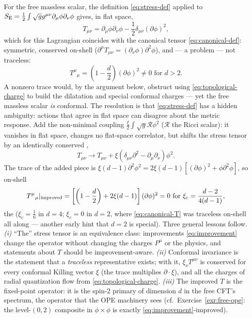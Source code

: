 \begin{eexample}
\label{ex:scalar-stress}
For the free massless scalar, the definition \eqref{eq:stress-def} applied to
$S_{\rm E} = \frac12\int \sqrt g g^{\mu\nu}\partial_\mu\phi\partial_\nu\phi$
gives, in flat space,
\begin{equation}
T_{\mu\nu} = \partial_\mu \phi \partial_\nu \phi
- \frac{1}{2}\delta_{\mu\nu} (\partial\phi)^2 ,
\label{eq:canonical-T}
\end{equation}
which for this Lagrangian coincides with the canonical tensor
\eqref{eq:canonical-def}: symmetric,
conserved on-shell ($\partial^\mu T_{\mu\nu} = (\partial_\nu \phi)
\partial^2\phi$), and --- a problem --- not traceless:
\begin{equation}
T^{\mu}{}_{\mu} = \left(1 - \frac d2\right)(\partial\phi)^2 \ne 0
\text{ for } d > 2.
\end{equation}
A nonzero trace would, by the argument below, obstruct using
\eqref{eq:topological-charge} to build the dilatation and special conformal
charges --- yet the free massless scalar \emph{is} conformal. The resolution
is that \eqref{eq:stress-def} has a hidden ambiguity: actions that agree in
flat space can disagree about the metric response. Add the non-minimal
coupling $\frac{\xi}{2} \int \sqrt g \mathcal{R} \phi^2$ ($\mathcal{R}$
the Ricci scalar): it vanishes in flat space, changes no flat-space
correlator, but shifts the stress tensor by an identically conserved
,
\begin{equation}
T_{\mu\nu} \longrightarrow T_{\mu\nu}
+ \xi \left(\delta_{\mu\nu}\partial^2 - \partial_\mu \partial_\nu\right)\phi^2 .
\label{eq:improvement}
\end{equation}
The trace of the added piece is $\xi(d-1)\partial^2\phi^2 =
2\xi(d-1)\left[(\partial\phi)^2 + \phi\partial^2\phi\right]$, so on-shell
\begin{equation}
T^{\mu}{}_{\mu}|_{\rm improved}
= \left[\left(1 - \frac d2\right) + 2\xi(d-1)\right](\partial\phi)^2
= 0
\text{ for }
\xi_c = \frac{d-2}{4(d-1)} ,
\label{eq:conformal-coupling}
\end{equation}
the  ($\xi_c = \frac16$ in $d = 4$; $\xi_c = 0$ in
$d=2$, where \eqref{eq:canonical-T} was traceless on-shell all along ---
another early hint that $d=2$ is special). Three general lessons follow.
\emph{(i)}
``The'' stress tensor is an equivalence class: improvements
\eqref{eq:improvement} change the operator without changing the charges
$P^\mu$ or the physics, and statements about $T$ should be improvement-aware.
\emph{(ii)} Conformal invariance is the statement that a \emph{traceless}
representative exists; with it, $\xi_\nu T^{\mu\nu}$ is conserved for every
conformal Killing vector $\xi$ (the trace multiplies $\partial\cdot\xi$),
and all the charges of radial quantization flow from
\eqref{eq:topological-charge}. \emph{(iii)} The improved $T$ is the
fixed-point operator: it is the spin-2 primary of dimension $d$ in the free
CFT's spectrum, the operator that the OPE machinery sees (cf.\
Exercise~\ref{exr:free-ope}: the level-$(0,2)$ composite in $\phi \times
\phi$ is exactly \eqref{eq:improvement}-improved).
\end{eexample}

